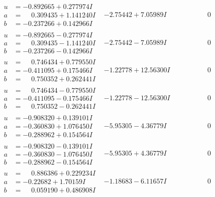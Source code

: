 \documentclass[1p]{elsarticle_modified}
\theoremstyle{definition}
\begin{document}
$$\begin{array}{c|c|c}
\begin{aligned}
u &= -0.892665 + 0.277974 I \\
a &= \phantom{-}0.309435 + 1.141240 I \\
b &= -0.237266 + 0.142966 I\end{aligned}
 & -2.75442 + 7.05989 I & \phantom{-0.000000 } 0 \\ \hline\begin{aligned}
u &= -0.892665 - 0.277974 I \\
a &= \phantom{-}0.309435 - 1.141240 I \\
b &= -0.237266 - 0.142966 I\end{aligned}
 & -2.75442 - 7.05989 I & \phantom{-0.000000 } 0 \\ \hline\begin{aligned}
u &= \phantom{-}0.746434 + 0.779550 I \\
a &= -0.411095 + 0.175466 I \\
b &= \phantom{-}0.750352 + 0.262441 I\end{aligned}
 & -1.22778 + 12.56300 I & \phantom{-0.000000 } 0 \\ \hline\begin{aligned}
u &= \phantom{-}0.746434 - 0.779550 I \\
a &= -0.411095 - 0.175466 I \\
b &= \phantom{-}0.750352 - 0.262441 I\end{aligned}
 & -1.22778 - 12.56300 I & \phantom{-0.000000 } 0 \\ \hline\begin{aligned}
u &= -0.908320 + 0.139101 I \\
a &= -0.360830 + 1.076450 I \\
b &= -0.288962 + 0.154564 I\end{aligned}
 & -5.95305 - 4.36779 I & \phantom{-0.000000 } 0 \\ \hline\begin{aligned}
u &= -0.908320 - 0.139101 I \\
a &= -0.360830 - 1.076450 I \\
b &= -0.288962 - 0.154564 I\end{aligned}
 & -5.95305 + 4.36779 I & \phantom{-0.000000 } 0 \\ \hline\begin{aligned}
u &= \phantom{-}0.886386 + 0.229234 I \\
a &= -0.22682 + 1.70159 I \\
b &= \phantom{-}0.059190 + 0.486908 I\end{aligned}
 & -1.18683 - 6.11657 I & \phantom{-0.000000 } 0 \\ \hline\begin{aligned}

\end{aligned}
\end{array}$$
\end{document}
